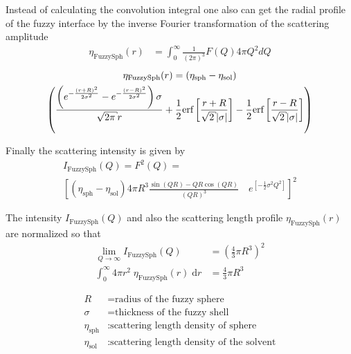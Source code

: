 Instead of calculating the convolution integral one also can get
the radial profile of the fuzzy interface by the inverse Fourier
transformation of the scattering amplitude
\begin{align}
\eta_\text{FuzzySph}(r) &= \int_0^{\infty}
\frac{1}{\left(2\pi\right)^3} F(Q) 4\pi Q^2 dQ
\end{align}
\begin{multline}
\eta_\text{FuzzySph}(r) = \left(\eta_\text{sph}-\eta_\text{sol}\right) \\
\left( \frac{
    \left(
          e^{-\frac{\left(r + R\right)^2}{2 \sigma^2}}
        - e^{-\frac{\left(r - R\right)^2}{2 \sigma^2}}
    \right) \sigma}{\sqrt{2 \pi} r}
 + \frac{1}{2} \text{erf}\left[\frac{r + R}{\sqrt{2} \abs{\sigma}}\right]
 - \frac{1}{2} \text{erf}\left[\frac{r - R}{\sqrt{2} \abs{\sigma}}\right]
\right)
\end{multline}

Finally the scattering intensity is given by
\begin{multline}
I_\text{FuzzySph}(Q) = F^2(Q) = \\
\left[ \left(\eta_\text{sph}-\eta_\text{sol}\right) 4\pi R^3
   \frac{\sin\left(QR\right)-QR\cos\left(QR\right)}{\left(QR\right)^3} \quad e^{\left[-\frac{1}{2}\sigma^2Q^2\right]}
\right]^2
\end{multline}

The intensity $I_\text{FuzzySph}(Q)$ and also the scattering
length profile $\eta_\text{FuzzySph}(r)$ are normalized so that
\begin{align*}
 \lim_{Q \to \infty} I_\text{FuzzySph}(Q) &= \left( \frac{4}{3}\pi R^3\right)^2 \\
 \int_0^{\infty} 4\pi r^2 \; \eta_\text{FuzzySph}(r) \; \mathrm{d}r &=\frac{4}{3}\pi R^3
\end{align*}

\begin{align}
R &=\text{radius of the fuzzy sphere} \nonumber\\
\sigma &=\text{thickness of the fuzzy shell} \nonumber\\
\eta_\text{sph}   & : \text{scattering length density of sphere} \nonumber \\
\eta_\text{sol}   & : \text{scattering length density of the solvent} \nonumber \\
\end{align}


